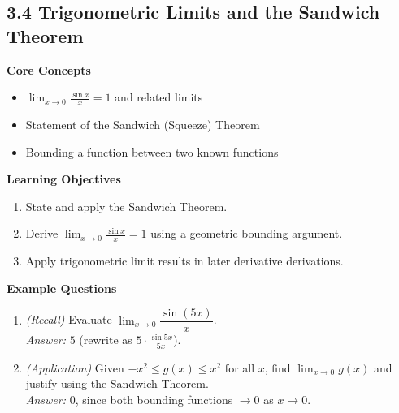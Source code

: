 \documentclass[11pt]{article}
\begin{document}
\subsection{3.4 Trigonometric Limits and the Sandwich Theorem}
\textbf{Core Concepts}
\begin{itemize}
\item $\displaystyle\lim_{x\to 0}\frac{\sin x}{x}=1$ and related limits
\item Statement of the Sandwich (Squeeze) Theorem
\item Bounding a function between two known functions
\end{itemize}
\textbf{Learning Objectives}
\begin{enumerate}
\item State and apply the Sandwich Theorem.
\item Derive $\displaystyle\lim_{x\to 0}\frac{\sin x}{x}=1$ using a geometric bounding argument.
\item Apply trigonometric limit results in later derivative derivations.
\end{enumerate}
\textbf{Example Questions}
\begin{enumerate}
\item \emph{(Recall)} Evaluate $\displaystyle\lim_{x\to 0}\dfrac{\sin(5x)}{x}$. \\
\textit{Answer:} $5$ (rewrite as $5\cdot\frac{\sin 5x}{5x}$).
\item \emph{(Application)} Given $-x^2 \le g(x) \le x^2$ for all $x$, find $\displaystyle\lim_{x\to0}g(x)$ and justify using the Sandwich Theorem. \\
\textit{Answer:} $0$, since both bounding functions $\to 0$ as $x\to 0$.
\end{enumerate}
\end{document}
